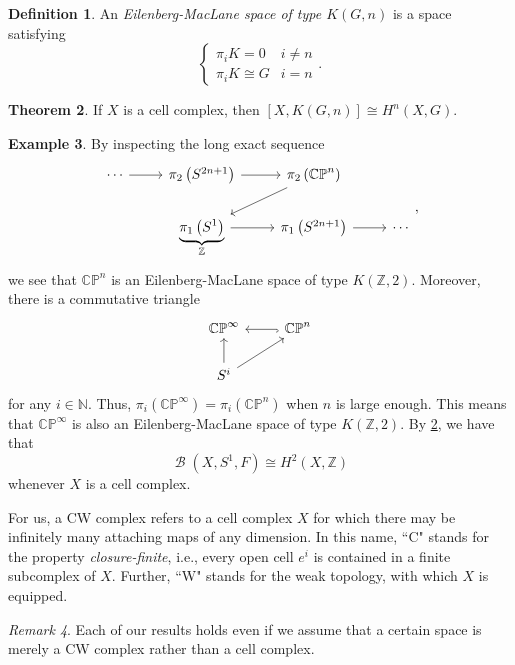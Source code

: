 \documentclass[10pt,letterpaper,cm]{nupset}
\theoremstyle{definition}
\newtheorem{defn}{Definition}[subsection]
\newtheorem{exmp}[defn]{Example}
\theoremstyle{theorem}
\newtheorem{theorem}[defn]{Theorem}
\theoremstyle{remark}
\newtheorem{remark}[defn]{Remark}
\newcommand{\CP}{\mathbb{CP}}
\newcommand{\N}{\mathbb N}
\newcommand{\Z}{\mathbb Z}
\newcommand{\1}{\mathbb{1}}
\newcommand{\0}{\vec 0}
\DeclareMathOperator{\B}{\mathcal{B}}
\begin{document}
\begin{defn}
An \textit{Eilenberg-MacLane space of type $K\left(G, n\right)$} is a space satisfying 
\[
\begin{cases}
\pi_i{K} = 0 & i \ne n
\\ \pi_i{K} \cong G & i =n
\end{cases}.
\]
\end{defn}

\begin{theorem}\label{EM}
If $X$ is a cell complex, then $\left[X, K\left(G, n\right)\right] \cong H^n\left(X, G\right)$.
\end{theorem}

\begin{exmp}
By inspecting the long exact sequence
\[
\begin{tikzcd}
\cdots \arrow[r] & \pi_2\left(S^{2n+1}\right) \arrow[r]              & \pi_2\left(\CP^n\right) \arrow[ld]   &        \\
                 & \underbrace{\pi_1\left(S^1\right)}_{\Z} \arrow[r] & \pi_1\left(S^{2n+1}\right) \arrow[r] & \cdots
\end{tikzcd}
,\] we see that $\CP^n$ is an Eilenberg-MacLane space of type $K\left(\Z, 2\right)$. Moreover, there is a commutative triangle
\[
\begin{tikzcd}
\CP^{\infty}             & \CP^n \arrow[l, hook] \\
S^i \arrow[u] \arrow[ru] &                      
\end{tikzcd}
\] for any $i\in \N$. Thus, $\pi_i\left(\CP^{\infty}\right) = \pi_i\left(\CP^n\right)$ when $n$ is large enough. This means that $\CP^{\infty}$ is also 
an Eilenberg-MacLane space of type $K\left(\Z, 2\right)$. By \cref{EM}, we have that $$\B\left(X, S^1, F\right) \cong H^2\left(X, \Z\right)$$ whenever $X$ is a cell complex. 
\end{exmp}

For us, a CW complex refers to a cell complex $X$ for which there may be infinitely many attaching maps of any dimension. In this name, ``C" stands for the property \textit{closure-finite}, i.e., every open cell $e^i$ is contained in a finite subcomplex of $X$. Further, ``W" stands for the weak topology, with which $X$ is equipped.

\begin{remark}
Each of our results holds even if we assume that a certain space is merely a CW complex rather than a cell complex. 
\end{remark}
\end{document}
